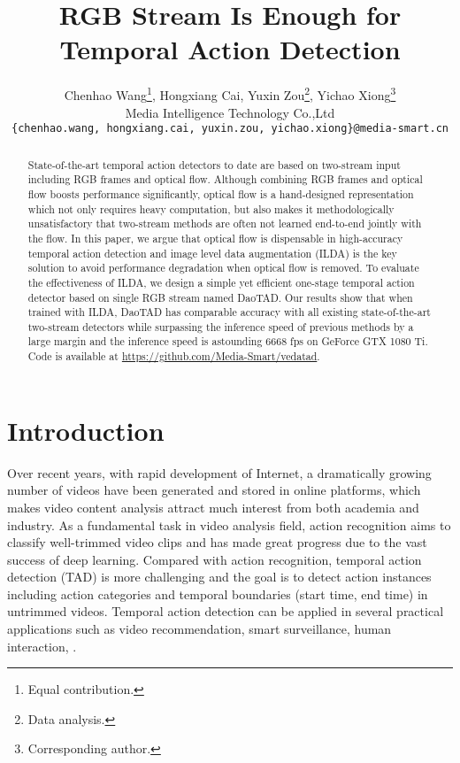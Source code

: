 \documentclass[final]{cvpr}
\begin{document}
\title{RGB Stream Is Enough for Temporal Action Detection}

\author{
 Chenhao Wang\thanks{Equal contribution.}, Hongxiang Cai\footnotemark[1], Yuxin Zou\thanks{Data analysis.}, Yichao Xiong\thanks{Corresponding author.} \\
  Media Intelligence Technology Co.,Ltd\\
  \texttt{\small \{chenhao.wang, hongxiang.cai, yuxin.zou, yichao.xiong\}@media-smart.cn} 
}

\maketitle


\begin{abstract}
State-of-the-art temporal action detectors to date are based on two-stream input including RGB frames and optical flow. Although combining RGB frames and optical flow boosts performance significantly, optical flow is a hand-designed representation which not only requires heavy computation, but also makes it methodologically unsatisfactory that two-stream methods are often not learned end-to-end jointly with the flow. In this paper, we argue that optical flow is dispensable in high-accuracy temporal action detection and image level data augmentation (ILDA) is the key solution to avoid performance degradation when optical flow is removed. To evaluate the effectiveness of ILDA, we design a simple yet efficient one-stage temporal action detector based on single RGB stream named DaoTAD. Our results show that when trained with ILDA, DaoTAD has comparable accuracy with all existing state-of-the-art two-stream detectors while surpassing the inference speed of previous methods by a large margin and the inference speed is astounding 6668 fps on GeForce GTX 1080 Ti. Code is available at \url{https://github.com/Media-Smart/vedatad}.
\end{abstract}

\section{Introduction}
Over recent years, with rapid development of Internet, a dramatically growing number of videos have been generated and stored in online platforms, which makes video content analysis attract much interest from both academia and industry. As a fundamental task in video analysis field, action recognition aims to classify well-trimmed video clips and has made great progress due to the vast success of deep learning. Compared with action recognition, temporal action detection (TAD) is more challenging and the goal is to detect action instances including action categories and temporal boundaries (start time, end time) in untrimmed videos. Temporal action detection can be applied in several practical applications such as video recommendation, smart surveillance, human interaction, \etc.
\end{document}
